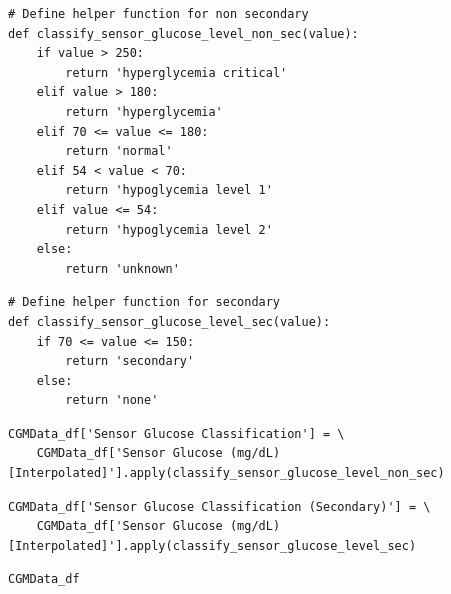 \begin{verbatim}
# Define helper function for non secondary
def classify_sensor_glucose_level_non_sec(value):
    if value > 250:
        return 'hyperglycemia critical'
    elif value > 180:
        return 'hyperglycemia'
    elif 70 <= value <= 180:
        return 'normal'
    elif 54 < value < 70:
        return 'hypoglycemia level 1'
    elif value <= 54:
        return 'hypoglycemia level 2'
    else:
        return 'unknown'
\end{verbatim}

\begin{verbatim}
# Define helper function for secondary
def classify_sensor_glucose_level_sec(value):
    if 70 <= value <= 150:
        return 'secondary'
    else:
        return 'none'
\end{verbatim}

\begin{verbatim}
CGMData_df['Sensor Glucose Classification'] = \
    CGMData_df['Sensor Glucose (mg/dL) [Interpolated]'].apply(classify_sensor_glucose_level_non_sec)
\end{verbatim}

\begin{verbatim}
CGMData_df['Sensor Glucose Classification (Secondary)'] = \
    CGMData_df['Sensor Glucose (mg/dL) [Interpolated]'].apply(classify_sensor_glucose_level_sec)
\end{verbatim}

\begin{verbatim}
CGMData_df
\end{verbatim}


